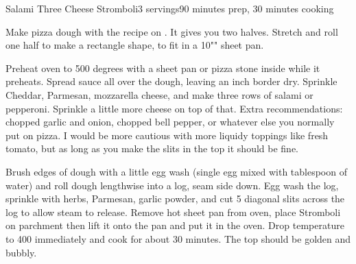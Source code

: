 \documentclass[../Cookbook.tex]{subfiles}
\begin{document}
\begin{recipe}{Salami Three Cheese Stromboli}{3 servings}{90 minutes prep, 30 minutes cooking}

Make pizza dough with the recipe on .
It gives you two halves. Stretch and roll one half to make a rectangle shape, to fit in a 10"" sheet pan.

Preheat oven to 500 degrees with a sheet pan or pizza stone inside while it preheats.
Spread sauce all over the dough, leaving an inch border dry. Sprinkle Cheddar, Parmesan, mozzarella cheese, and make three rows of salami or pepperoni. Sprinkle a little more cheese on top of that.
Extra recommendations: chopped garlic and onion, chopped bell pepper, or whatever else you normally put on pizza. I would be more cautious with more liquidy toppings like fresh tomato, but as long as you make the slits in the top it should be fine.

Brush edges of dough with a little egg wash (single egg mixed with tablespoon of water) and roll dough lengthwise into a log, seam side down.
Egg wash the log, sprinkle with herbs, Parmesan, garlic powder, and cut 5 diagonal slits across the log to allow steam to release.
Remove hot sheet pan from oven, place Stromboli on parchment then lift it onto the pan and put it in the oven. Drop temperature to 400 immediately and cook for about 30 minutes. The top should be golden and bubbly.

\end{recipe}
\end{document}
